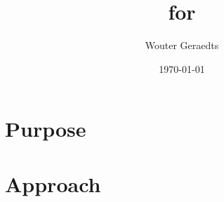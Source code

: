 \documentclass[a4paper,oneside]{article}
\title{\Premiseselection for \coq}
\author{Wouter Geraedts}
\date{\today}
\begin{document}
	\maketitle
	
	
	\section{Purpose}
	
	
	\section{Approach}
	
	
	
    
    
\end{document}
